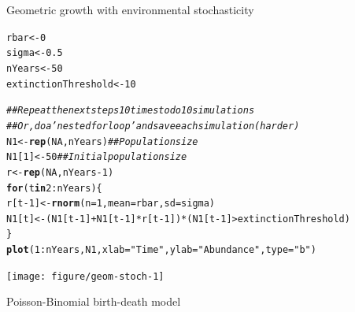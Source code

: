 \documentclass[12pt]{article}\usepackage[]{graphicx}\usepackage[]{xcolor}
\makeatletter
\newcommand{\hlnum}[1]{\textcolor[rgb]{0.686,0.059,0.569}{#1}}%
\newcommand{\hlstr}[1]{\textcolor[rgb]{0.192,0.494,0.8}{#1}}%
\newcommand{\hlcom}[1]{\textcolor[rgb]{0.678,0.584,0.686}{\textit{#1}}}%
\newcommand{\hlopt}[1]{\textcolor[rgb]{0,0,0}{#1}}%
\newcommand{\hlstd}[1]{\textcolor[rgb]{0.345,0.345,0.345}{#1}}%
\newcommand{\hlkwa}[1]{\textcolor[rgb]{0.161,0.373,0.58}{\textbf{#1}}}%
\newcommand{\hlkwb}[1]{\textcolor[rgb]{0.69,0.353,0.396}{#1}}%
\newcommand{\hlkwc}[1]{\textcolor[rgb]{0.333,0.667,0.333}{#1}}%
\newcommand{\hlkwd}[1]{\textcolor[rgb]{0.737,0.353,0.396}{\textbf{#1}}}%
\newenvironment{kframe}{%
 \def\at@end@of@kframe{}%
 \ifinner\ifhmode%
  \def\at@end@of@kframe{\end{minipage}}%
  \begin{minipage}{\columnwidth}%
 \fi\fi%
 \def\FrameCommand##1{\hskip\@totalleftmargin \hskip-\fboxsep
 \colorbox{shadecolor}{##1}\hskip-\fboxsep
     \hskip-\linewidth \hskip-\@totalleftmargin \hskip\columnwidth}%
 \MakeFramed {\advance\hsize-\width
   \@totalleftmargin\z@ \linewidth\hsize
   \@setminipage}}%
 {\par\unskip\endMakeFramed%
 \at@end@of@kframe}
\newenvironment{knitrout}{}{} %
\makeatother
\begin{document}
Geometric growth with environmental stochasticity
\begin{knitrout}
\color{fgcolor}\begin{kframe}
\begin{alltt}
\hlstd{rbar} \hlkwb{<-} \hlnum{0}
\hlstd{sigma} \hlkwb{<-} \hlnum{0.5}
\hlstd{nYears} \hlkwb{<-} \hlnum{50}
\hlstd{extinctionThreshold} \hlkwb{<-} \hlnum{10}

\hlcom{## Repeat the next steps 10 times to do 10 simulations}
\hlcom{## Or, do a 'nested for loop' and save each simulation (harder)}
\hlstd{N1} \hlkwb{<-} \hlkwd{rep}\hlstd{(}\hlnum{NA}\hlstd{, nYears)}  \hlcom{## Population size }
\hlstd{N1[}\hlnum{1}\hlstd{]} \hlkwb{<-} \hlnum{50}            \hlcom{## Initial population size}
\hlstd{r} \hlkwb{<-} \hlkwd{rep}\hlstd{(}\hlnum{NA}\hlstd{, nYears}\hlopt{-}\hlnum{1}\hlstd{)}
\hlkwa{for}\hlstd{(t} \hlkwa{in} \hlnum{2}\hlopt{:}\hlstd{nYears) \{}
    \hlstd{r[t}\hlopt{-}\hlnum{1}\hlstd{]} \hlkwb{<-} \hlkwd{rnorm}\hlstd{(}\hlkwc{n}\hlstd{=}\hlnum{1}\hlstd{,} \hlkwc{mean}\hlstd{=rbar,} \hlkwc{sd}\hlstd{=sigma)}
    \hlstd{N1[t]} \hlkwb{<-} \hlstd{(N1[t}\hlopt{-}\hlnum{1}\hlstd{]} \hlopt{+} \hlstd{N1[t}\hlopt{-}\hlnum{1}\hlstd{]}\hlopt{*}\hlstd{r[t}\hlopt{-}\hlnum{1}\hlstd{])}\hlopt{*}\hlstd{(N1[t}\hlopt{-}\hlnum{1}\hlstd{]}\hlopt{>}\hlstd{extinctionThreshold)}
\hlstd{\}}
\hlkwd{plot}\hlstd{(}\hlnum{1}\hlopt{:}\hlstd{nYears, N1,} \hlkwc{xlab}\hlstd{=}\hlstr{"Time"}\hlstd{,} \hlkwc{ylab}\hlstd{=}\hlstr{"Abundance"}\hlstd{,} \hlkwc{type}\hlstd{=}\hlstr{"b"}\hlstd{)}
\end{alltt}
\end{kframe}

{\centering \texttt{[image: figure/geom-stoch-1]} 

}


\end{knitrout}


\newpage

Poisson-Binomial birth-death model
\end{document}
